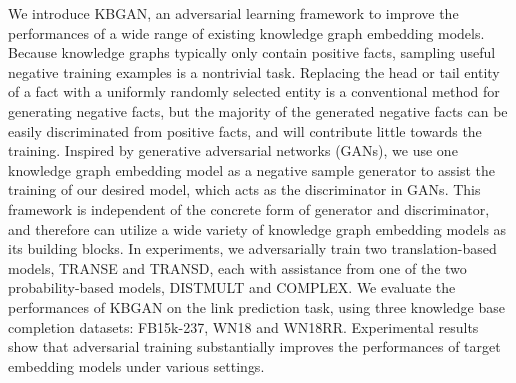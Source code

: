 We introduce KBGAN, an adversarial learning framework to improve the performances of a wide range of existing knowledge graph embedding models. Because knowledge graphs typically only contain positive facts, sampling useful negative training examples is a nontrivial task. Replacing the head or tail entity of a fact with a uniformly randomly selected entity is a conventional method for generating negative facts, but the majority of the generated negative facts can be easily discriminated from positive facts, and will contribute little towards the training. Inspired by generative adversarial networks (GANs), we use one knowledge graph embedding model as a negative sample generator to assist the training of our desired model, which acts as the discriminator in GANs. This framework is independent of the concrete form of generator and discriminator, and therefore can utilize a wide variety of knowledge graph embedding models as its building blocks. In experiments, we adversarially train two translation-based models, TRANSE and TRANSD, each with assistance from one of the two probability-based models, DISTMULT and COMPLEX. We evaluate the performances of KBGAN on the link prediction task, using three knowledge base completion datasets: FB15k-237, WN18 and WN18RR. Experimental results show that adversarial training substantially improves the performances of target embedding models under various settings.
